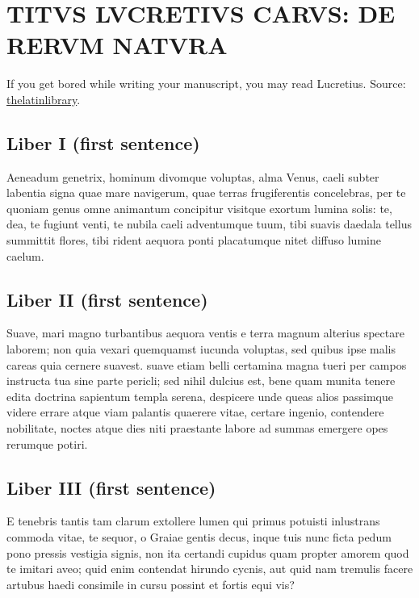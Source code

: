 \chapter{TITVS LVCRETIVS CARVS: DE RERVM NATVRA}

\minitoc %

If you get bored while writing your manuscript, you may read Lucretius.
Source: \href{http://www.thelatinlibrary.com/lucretius.html}{thelatinlibrary}.


\section{Liber I (first sentence)}

Aeneadum genetrix, hominum divomque voluptas,
alma Venus, caeli subter labentia signa
quae mare navigerum, quae terras frugiferentis
concelebras, per te quoniam genus omne animantum
concipitur visitque exortum lumina solis:
te, dea, te fugiunt venti, te nubila caeli
adventumque tuum, tibi suavis daedala tellus
summittit flores, tibi rident aequora ponti
placatumque nitet diffuso lumine caelum.


\section{Liber II (first sentence)}

Suave, mari magno turbantibus aequora ventis
e terra magnum alterius spectare laborem;
non quia vexari quemquamst iucunda voluptas,
sed quibus ipse malis careas quia cernere suavest.
suave etiam belli certamina magna tueri              
per campos instructa tua sine parte pericli;               
sed nihil dulcius est, bene quam munita tenere               
edita doctrina sapientum templa serena,
despicere unde queas alios passimque videre
errare atque viam palantis quaerere vitae,               
certare ingenio, contendere nobilitate,
noctes atque dies niti praestante labore
ad summas emergere opes rerumque potiri.


\section{Liber III (first sentence)}

E tenebris tantis tam clarum extollere lumen
qui primus potuisti inlustrans commoda vitae,
te sequor, o Graiae gentis decus, inque tuis nunc
ficta pedum pono pressis vestigia signis,
non ita certandi cupidus quam propter amorem
quod te imitari aveo; quid enim contendat hirundo
cycnis, aut quid nam tremulis facere artubus haedi
consimile in cursu possint et fortis equi vis?


